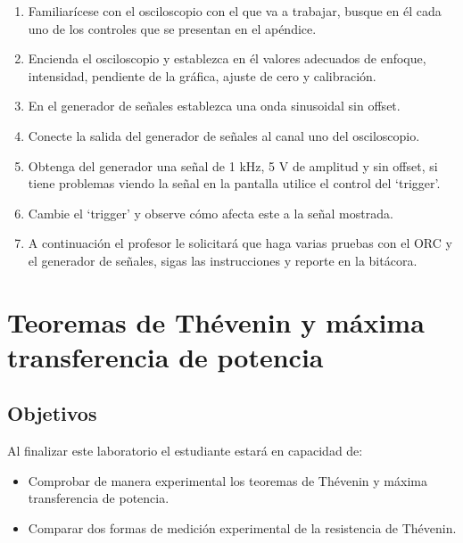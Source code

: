 \documentclass[12pt,letterpaper]{report}
\newcommand{\obj}{Objetivos}
\newcommand{\capacidad}{Al finalizar este laboratorio el estudiante estará en capacidad de:}
\begin{document}
\begin{enumerate}
\item Familiarícese con el osciloscopio con el que va a trabajar, busque en él cada
uno de los controles que se presentan en el apéndice.
\item Encienda el osciloscopio y establezca en él valores adecuados de enfoque,
intensidad, pendiente de la gráfica, ajuste de cero y calibración.
\item En el generador de señales establezca una onda sinusoidal sin offset.
\item Conecte la salida del generador de señales al canal uno del osciloscopio.
\item Obtenga del generador una señal de 1 kHz, 5 V de amplitud y sin offset, si
tiene problemas viendo la señal en la pantalla utilice el control del ‘trigger’.
\item Cambie el ‘trigger’ y observe cómo afecta este a la señal mostrada.
\item A continuación el profesor le solicitará que haga varias pruebas con el ORC
y el generador de señales, sigas las instrucciones y reporte en la bitácora.
\end{enumerate}

\chapter{Teoremas de Thévenin y máxima transferencia de potencia}

\section{\obj}
\capacidad
\begin{itemize}
\item Comprobar de manera experimental los teoremas de Thévenin y máxima
transferencia de potencia.
\item Comparar dos formas de medición experimental de la resistencia de
Thévenin.
\end{itemize}
\end{document}

